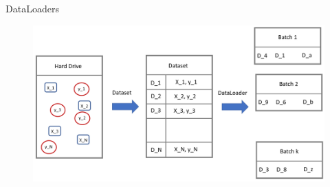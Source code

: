 \documentclass[10pt]{beamer}
\theoremstyle{remark}
\theoremstyle{definition}
\begin{document}
\begin{frame}[allowframebreaks]{DataLoaders}
    
\framebreak

    \begin{figure}
    \centering
    \includegraphics[width=1.0\textwidth,height=1.0\textheight,keepaspectratio]{./images/dataloaders.png}
    \end{figure}
\end{frame}
\end{document}
